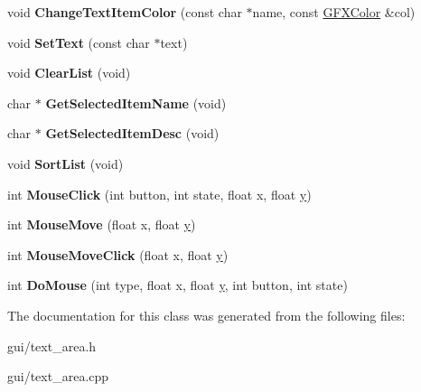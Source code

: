 \begin{DoxyCompactItemize}
\item 
void {\bfseries Change\+Text\+Item\+Color} (const char $\ast$name, const \hyperlink{structGFXColor}{G\+F\+X\+Color} \&col)\hypertarget{classTextArea_a137e06be3faaea05bee28a2d199ee560}{}\label{classTextArea_a137e06be3faaea05bee28a2d199ee560}

\item 
void {\bfseries Set\+Text} (const char $\ast$text)\hypertarget{classTextArea_a202d242e323c410d83d119e2a5d41220}{}\label{classTextArea_a202d242e323c410d83d119e2a5d41220}

\item 
void {\bfseries Clear\+List} (void)\hypertarget{classTextArea_a526368360d4d80e73e9db83a099bc6b0}{}\label{classTextArea_a526368360d4d80e73e9db83a099bc6b0}

\item 
char $\ast$ {\bfseries Get\+Selected\+Item\+Name} (void)\hypertarget{classTextArea_a5b6c95d2a49619a8986edec2479eec9b}{}\label{classTextArea_a5b6c95d2a49619a8986edec2479eec9b}

\item 
char $\ast$ {\bfseries Get\+Selected\+Item\+Desc} (void)\hypertarget{classTextArea_a2b002c5059a7bdee6eccabfb193fa4f1}{}\label{classTextArea_a2b002c5059a7bdee6eccabfb193fa4f1}

\item 
void {\bfseries Sort\+List} (void)\hypertarget{classTextArea_a70f559d0430aae8d0059bbf854a28037}{}\label{classTextArea_a70f559d0430aae8d0059bbf854a28037}

\item 
int {\bfseries Mouse\+Click} (int button, int state, float x, float \hyperlink{IceUtils_8h_aa7ffaed69623192258fb8679569ff9ba}{y})\hypertarget{classTextArea_a133aab4cbcc777b5882b01043fc9d4c3}{}\label{classTextArea_a133aab4cbcc777b5882b01043fc9d4c3}

\item 
int {\bfseries Mouse\+Move} (float x, float \hyperlink{IceUtils_8h_aa7ffaed69623192258fb8679569ff9ba}{y})\hypertarget{classTextArea_a6a33c5ba319f7d542c1e71636d01887e}{}\label{classTextArea_a6a33c5ba319f7d542c1e71636d01887e}

\item 
int {\bfseries Mouse\+Move\+Click} (float x, float \hyperlink{IceUtils_8h_aa7ffaed69623192258fb8679569ff9ba}{y})\hypertarget{classTextArea_a777728abed6b4143c3cde2248ae2d08d}{}\label{classTextArea_a777728abed6b4143c3cde2248ae2d08d}

\item 
int {\bfseries Do\+Mouse} (int type, float x, float \hyperlink{IceUtils_8h_aa7ffaed69623192258fb8679569ff9ba}{y}, int button, int state)\hypertarget{classTextArea_ac5c0b7508f9af568ac836de29d9bacae}{}\label{classTextArea_ac5c0b7508f9af568ac836de29d9bacae}

\end{DoxyCompactItemize}


The documentation for this class was generated from the following files\+:\begin{DoxyCompactItemize}
\item 
gui/text\+\_\+area.\+h\item 
gui/text\+\_\+area.\+cpp\end{DoxyCompactItemize}
